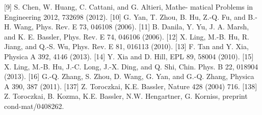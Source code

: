\documentclass[onecolumn,preprintnumbers,amsmath,amssymb]{revtex4}
\begin{document}
\begin{thebibliography}{00}
[9] S. Chen, W. Huang, C. Cattani, and G. Altieri, Mathe- matical Problems in Engineering 2012, 732698 (2012).
[10] G. Yan, T. Zhou, B. Hu, Z.-Q. Fu, and B.-H. Wang, Phys. Rev. E 73, 046108 (2006).
[11] B. Danila, Y. Yu, J. A. Marsh, and K. E. Bassler, Phys. Rev. E 74, 046106 (2006).
[12] X. Ling, M.-B. Hu, R. Jiang, and Q.-S. Wu, Phys. Rev. E 81, 016113 (2010).
[13] F. Tan and Y. Xia, Physica A 392, 4146 (2013).
[14] Y. Xia and D. Hill, EPL 89, 58004 (2010).
[15] X. Ling, M.-B. Hu, J.-C. Long, J.-X. Ding, and Q. Shi,
Chin. Phys. B 22, 018904 (2013).
[16] G.-Q. Zhang, S. Zhou, D. Wang, G. Yan, and G.-Q.
Zhang, Physica A 390, 387 (2011).
[137] Z. Toroczkai, K.E. Bassler, Nature 428 (2004) 716.
[138] Z. Toroczkai, B. Kozma, K.E. Bassler, N.W. Hengartner, G. Korniss, preprint cond-mat/0408262.

\end{thebibliography}
\end{document}

